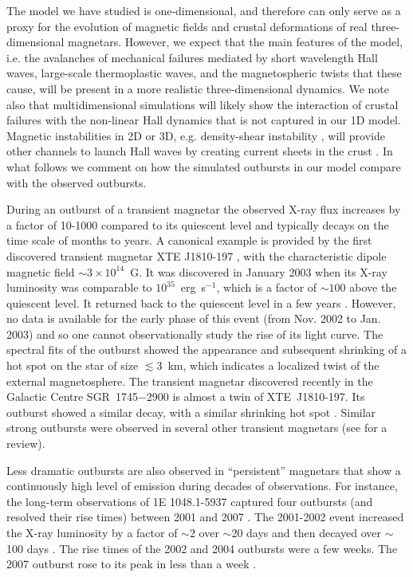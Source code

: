The model we have studied is one-dimensional, and therefore can only serve as a proxy for the evolution of magnetic fields and crustal deformations of real three-dimensional magnetars. 
However, we expect that the main features of the model, i.e. the avalanches of mechanical failures mediated by short wavelength Hall waves, large-scale thermoplastic waves, and the magnetospheric twists that these  cause, will be present in a more realistic three-dimensional dynamics. 
We note also that multidimensional simulations will likely show the interaction of crustal failures with the non-linear Hall dynamics that is not captured in our 1D model.
Magnetic instabilities in 2D or 3D, e.g. density-shear instability  \citep{2014PhPl...21e2110W,2015MNRAS.453L..93G}, will provide other channels to launch Hall waves by creating current sheets in the crust \citep{2016PNAS..113.3944G}.
In what follows we comment on how the simulated outbursts in our model compare with the observed outbursts.

During an outburst of a transient magnetar the observed X-ray flux increases by a factor of 10-1000 compared to its quiescent level and typically decays on the time scale of months to years. A canonical example is provided by the first discovered  transient magnetar  XTE J1810-197 \citep{2004ApJ...609L..21I}, with the characteristic dipole magnetic field $\sim 3\times 10^{14}$~G. 
It was discovered in January 2003 when its X-ray luminosity was comparable to $10^{35}$~erg~s$^{-1}$, which is a factor of $\sim 100$ above the quiescent level. 
It returned back to the quiescent level in a few years \citep{2007Ap&SS.308...79G}.
However, no data is available for the early phase of this event (from Nov. 2002 to Jan. 2003) and so one cannot observationally study the rise of its light curve. 
The spectral fits of the outburst showed the appearance and subsequent shrinking of a hot spot on the star of size $\lesssim 3$~km, which indicates a localized twist of the external magnetosphere. 
The transient magnetar discovered recently in the Galactic Centre SGR~1745$-$2900 \citep{2013ApJ...770L..24K,2013ApJ...770L..23M} is almost a twin of  XTE~J1810-197. Its outburst showed a similar decay, with a similar shrinking hot spot \citep{2014ApJ...786...84K,2015MNRAS.449.2685C}.
Similar strong outbursts were observed in several other transient magnetars (see \citet{2011ASSP...21..247R} for a review).

Less dramatic outbursts are also observed in ``persistent'' magnetars that show a continuously high level of emission during decades of observations. 
For instance, the long-term observations of 1E 1048.1-5937 captured four outbursts (and resolved their rise times) between 2001 and 2007 \citep{2008ApJ...677..503T}. The 2001-2002 event increased the X-ray luminosity by a factor of $\sim 2$ over $\sim 20$ days and then decayed over
$\sim$100 days \citep{2004ApJ...609L..67G}. 
The rise times of the 2002 and 2004 outbursts were a few weeks. 
The 2007 outburst rose to its peak in less than a week \citep{2008ApJ...677..503T}.

